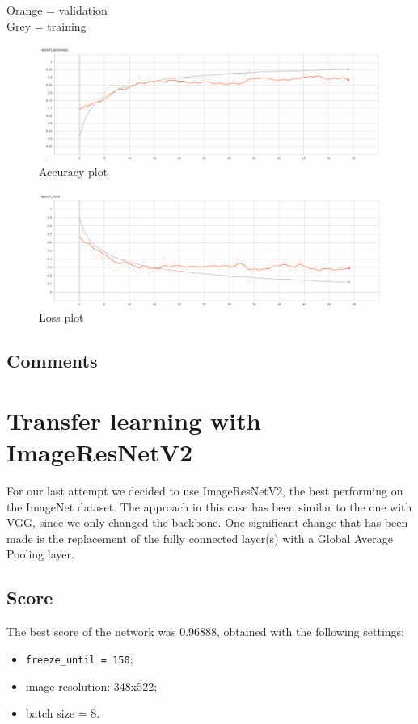 \documentclass[12pt,a4paper]{report}
\begin{document}
		Orange = validation\\
		Grey = training
		\begin{figure}[H]
			\includegraphics[scale = 0.5, center]{vgg accuracy}
			\caption{Accuracy plot}
		\end{figure}
		\begin{figure}[H]
			\includegraphics[scale = 0.5, center]{vgg loss}
			\caption{Loss plot}
		\end{figure}
		\subsection{Comments}

\section{Transfer learning with ImageResNetV2}
For our last attempt we decided to use ImageResNetV2, the best performing on the ImageNet dataset. The approach in this case has been similar to the one with VGG, since we only changed the backbone. One significant change that has been made is the replacement of the fully connected layer(s) with a Global Average Pooling layer.
\subsection{Score}
	The best score of the network was 0.96888, obtained with the following settings:
	\begin{itemize}
		\item	\texttt{freeze\_until = 150};
		\item image resolution: 348x522;
		\item batch size = 8.
	\end{itemize}
\end{document}
